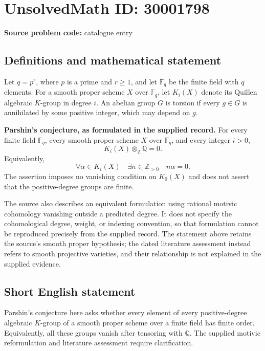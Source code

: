 \documentclass[11pt]{article}
\newcommand{\Z}{\mathbb{Z}}
\newcommand{\Q}{\mathbb{Q}}
\newcommand{\F}{\mathbb{F}}
\begin{document}
\section*{UnsolvedMath ID: 30001798}
\textbf{Source problem code:} catalogue entry
\subsection{Definitions and mathematical statement}
Let \(q=p^r\), where \(p\) is a prime and \(r\geq 1\), and let \(\F_q\) be the finite field with \(q\) elements. For a smooth proper scheme \(X\) over \(\F_q\), let \(K_i(X)\) denote its Quillen algebraic \(K\)-group in degree \(i\). An abelian group \(G\) is torsion if every \(g\in G\) is annihilated by some positive integer, which may depend on \(g\).

\textbf{Parshin's conjecture, as formulated in the supplied record.} For every finite field \(\F_q\), every smooth proper scheme \(X\) over \(\F_q\), and every integer \(i>0\),
\[
K_i(X)\otimes_{\Z}\Q=0.
\]
Equivalently,
\[
\forall\alpha\in K_i(X)\quad \exists n\in\Z_{>0}\quad n\alpha=0.
\]
The assertion imposes no vanishing condition on \(K_0(X)\) and does not assert that the positive-degree groups are finite.

The source also describes an equivalent formulation using rational motivic cohomology vanishing outside a predicted degree. It does not specify the cohomological degree, weight, or indexing convention, so that formulation cannot be reproduced precisely from the supplied record. The statement above retains the source's smooth proper hypothesis; the dated literature assessment instead refers to smooth projective varieties, and their relationship is not explained in the supplied evidence.
\subsection{Short English statement}
Parshin's conjecture here asks whether every element of every positive-degree algebraic \(K\)-group of a smooth proper scheme over a finite field has finite order. Equivalently, all these groups vanish after tensoring with \(\Q\). The supplied motivic reformulation and literature assessment require clarification.
\end{document}
